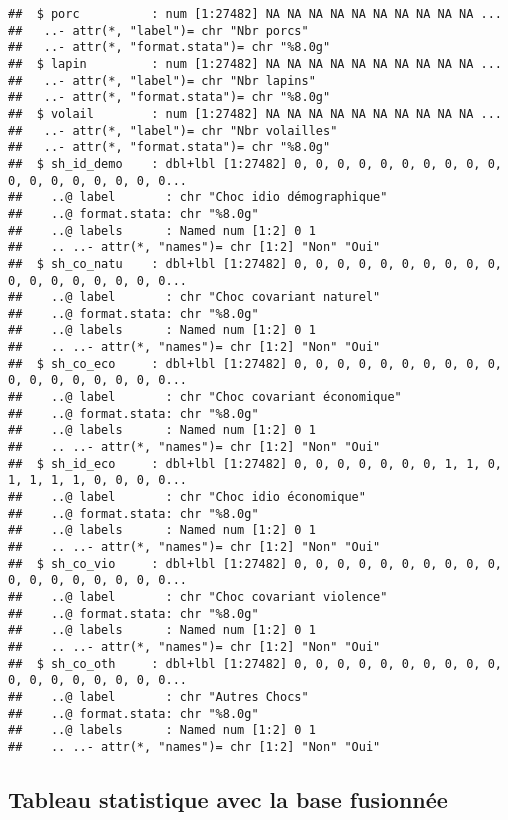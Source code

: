 \documentclass[
]{article}
\begin{document}
\begin{verbatim}
##  $ porc          : num [1:27482] NA NA NA NA NA NA NA NA NA NA ...
##   ..- attr(*, "label")= chr "Nbr porcs"
##   ..- attr(*, "format.stata")= chr "%8.0g"
##  $ lapin         : num [1:27482] NA NA NA NA NA NA NA NA NA NA ...
##   ..- attr(*, "label")= chr "Nbr lapins"
##   ..- attr(*, "format.stata")= chr "%8.0g"
##  $ volail        : num [1:27482] NA NA NA NA NA NA NA NA NA NA ...
##   ..- attr(*, "label")= chr "Nbr volailles"
##   ..- attr(*, "format.stata")= chr "%8.0g"
##  $ sh_id_demo    : dbl+lbl [1:27482] 0, 0, 0, 0, 0, 0, 0, 0, 0, 0, 0, 0, 0, 0, 0, 0, 0, 0...
##    ..@ label       : chr "Choc idio démographique"
##    ..@ format.stata: chr "%8.0g"
##    ..@ labels      : Named num [1:2] 0 1
##    .. ..- attr(*, "names")= chr [1:2] "Non" "Oui"
##  $ sh_co_natu    : dbl+lbl [1:27482] 0, 0, 0, 0, 0, 0, 0, 0, 0, 0, 0, 0, 0, 0, 0, 0, 0, 0...
##    ..@ label       : chr "Choc covariant naturel"
##    ..@ format.stata: chr "%8.0g"
##    ..@ labels      : Named num [1:2] 0 1
##    .. ..- attr(*, "names")= chr [1:2] "Non" "Oui"
##  $ sh_co_eco     : dbl+lbl [1:27482] 0, 0, 0, 0, 0, 0, 0, 0, 0, 0, 0, 0, 0, 0, 0, 0, 0, 0...
##    ..@ label       : chr "Choc covariant économique"
##    ..@ format.stata: chr "%8.0g"
##    ..@ labels      : Named num [1:2] 0 1
##    .. ..- attr(*, "names")= chr [1:2] "Non" "Oui"
##  $ sh_id_eco     : dbl+lbl [1:27482] 0, 0, 0, 0, 0, 0, 0, 1, 1, 0, 1, 1, 1, 1, 0, 0, 0, 0...
##    ..@ label       : chr "Choc idio économique"
##    ..@ format.stata: chr "%8.0g"
##    ..@ labels      : Named num [1:2] 0 1
##    .. ..- attr(*, "names")= chr [1:2] "Non" "Oui"
##  $ sh_co_vio     : dbl+lbl [1:27482] 0, 0, 0, 0, 0, 0, 0, 0, 0, 0, 0, 0, 0, 0, 0, 0, 0, 0...
##    ..@ label       : chr "Choc covariant violence"
##    ..@ format.stata: chr "%8.0g"
##    ..@ labels      : Named num [1:2] 0 1
##    .. ..- attr(*, "names")= chr [1:2] "Non" "Oui"
##  $ sh_co_oth     : dbl+lbl [1:27482] 0, 0, 0, 0, 0, 0, 0, 0, 0, 0, 0, 0, 0, 0, 0, 0, 0, 0...
##    ..@ label       : chr "Autres Chocs"
##    ..@ format.stata: chr "%8.0g"
##    ..@ labels      : Named num [1:2] 0 1
##    .. ..- attr(*, "names")= chr [1:2] "Non" "Oui"
\end{verbatim}

\subsection{Tableau statistique avec la base
fusionnée}\label{tableau-statistique-avec-la-base-fusionnuxe9e}
\end{document}
